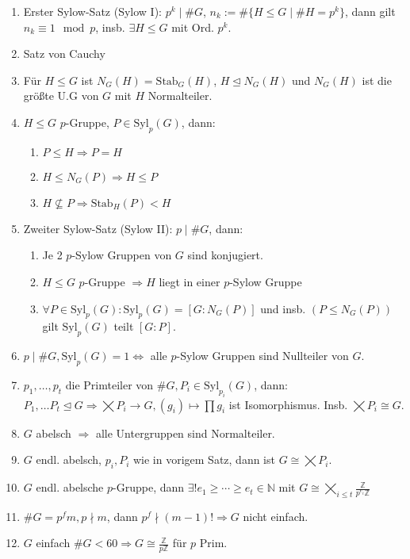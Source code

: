 \documentclass[twocolumn]{report}
\begin{document}
\begin{enumerate}[label=2.\arabic*, itemsep=0pt, topsep=0pt, parsep=0pt, partopsep=0pt, leftmargin=*]
    \item Erster Sylow-Satz (Sylow I): $p^k \mid \#G$, $n_k:= \#\{H \le G \mid \# H = p^k\}$, dann gilt $n_k \equiv 1 \mod p$, insb. $\exists H \le G$ mit Ord. $p^k$.
    \item Satz von Cauchy
    \item Für $H \le G$ ist $N_G(H) = \text{Stab}_G(H)$, $H \trianglelefteq N_G(H)$ und $N_G(H)$ ist die größte U.G von $G$ mit $H$ Normalteiler.
    \item $H \le G$ $p$-Gruppe, $P \in \text{Syl}_p(G)$, dann:
    \begin{enumerate}[label=(\arabic*), itemsep=0pt, topsep=0pt, parsep=0pt, partopsep=0pt, leftmargin=*]
        \item $P \le H \Rightarrow P = H$
        \item $H \le N_G(P) \Rightarrow H \le P$
        \item $H \not\subseteq P \Rightarrow \text{Stab}_H(P) < H$
    \end{enumerate}
    \item Zweiter Sylow-Satz (Sylow II): $p \mid \#G$, dann:
    \begin{enumerate}[label=(\arabic*), itemsep=0pt, topsep=0pt, parsep=0pt, partopsep=0pt, leftmargin=*]
        \item Je 2 $p$-Sylow Gruppen von $G$ sind konjugiert.
        \item $H \le G$ $p$-Gruppe $\Rightarrow H$ liegt in einer $p$-Sylow Gruppe
        \item $\forall P \in \text{Syl}_p(G):\text{Syl}_p(G) = [G:N_G(P)]$ und insb. $(P \le N_G(P))$ gilt $\text{Syl}_p(G)$ teilt $[G:P]$.
    \end{enumerate}
    \item $p \mid \#G, \text{Syl}_p(G) = 1 \iff$ alle $p$-Sylow Gruppen sind Nullteiler von $G$.
    \item $p_1, \ldots, p_t$ die Primteiler von $\#G, P_i \in \text{Syl}_{p_i}(G)$, dann: $P_1, \ldots P_t \trianglelefteq G \Rightarrow \bigtimes P_i \to G, (g_i) \mapsto \prod g_i$ ist Isomorphismus. Insb. $\bigtimes P_i \cong G$.
    \item $G$ abelsch $\Rightarrow$ alle Untergruppen sind Normalteiler.
    \item $G$ endl. abelsch, $p_i, P_i$ wie in vorigem Satz, dann ist $G \cong \bigtimes P_i$.
    \item $G$ endl. abelsche $p$-Gruppe, dann $\exists ! e_1 \ge \cdots \ge e_t \in \mathbb{N}$ mit $G \cong \bigtimes_{i \le t}\frac{\mathbb{Z}}{p^{e_i}\mathbb{Z}}$
    \item $\#G = p^f m, p \nmid m$, dann $p^f \nmid (m-1)! \Rightarrow G$ nicht einfach.
    \item $G$ einfach $\#G < 60 \Rightarrow G \cong \frac{\mathbb{Z}}{p\mathbb{Z}}$ für $p$ Prim.
\end{enumerate}
\end{document}
